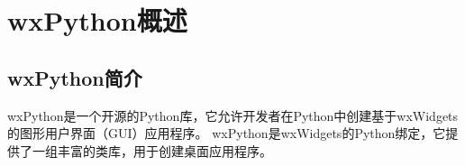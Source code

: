 \chapter{wxPython概述}
\section{wxPython简介}
wxPython是一个开源的Python库，它允许开发者在Python中创建基于wxWidgets的图形用户界面（GUI）应用程序。
wxPython是wxWidgets的Python绑定，它提供了一组丰富的类库，用于创建桌面应用程序。


